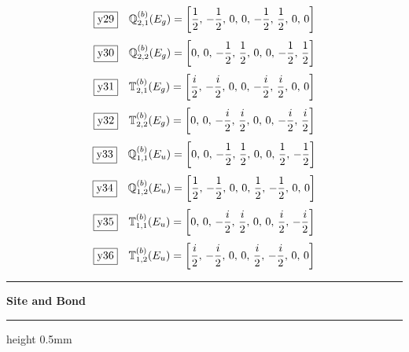 \documentclass[fleqn,10pt,landscape]{jsarticle}
\begin{document}
\begin{dmath*}
\fbox{y29}\quad \mathbb{Q}_{2,1}^{(b)}(E_{g})=\left[ \frac{1}{2},\, - \frac{1}{2},\, 0,\, 0,\, - \frac{1}{2},\, \frac{1}{2},\, 0,\, 0 \right]
\end{dmath*}
\begin{dmath*}
\fbox{y30}\quad \mathbb{Q}_{2,2}^{(b)}(E_{g})=\left[ 0,\, 0,\, - \frac{1}{2},\, \frac{1}{2},\, 0,\, 0,\, - \frac{1}{2},\, \frac{1}{2} \right]
\end{dmath*}
\begin{dmath*}
\fbox{y31}\quad \mathbb{T}_{2,1}^{(b)}(E_{g})=\left[ \frac{i}{2},\, - \frac{i}{2},\, 0,\, 0,\, - \frac{i}{2},\, \frac{i}{2},\, 0,\, 0 \right]
\end{dmath*}
\begin{dmath*}
\fbox{y32}\quad \mathbb{T}_{2,2}^{(b)}(E_{g})=\left[ 0,\, 0,\, - \frac{i}{2},\, \frac{i}{2},\, 0,\, 0,\, - \frac{i}{2},\, \frac{i}{2} \right]
\end{dmath*}
\begin{dmath*}
\fbox{y33}\quad \mathbb{Q}_{1,1}^{(b)}(E_{u})=\left[ 0,\, 0,\, - \frac{1}{2},\, \frac{1}{2},\, 0,\, 0,\, \frac{1}{2},\, - \frac{1}{2} \right]
\end{dmath*}
\begin{dmath*}
\fbox{y34}\quad \mathbb{Q}_{1,2}^{(b)}(E_{u})=\left[ \frac{1}{2},\, - \frac{1}{2},\, 0,\, 0,\, \frac{1}{2},\, - \frac{1}{2},\, 0,\, 0 \right]
\end{dmath*}
\begin{dmath*}
\fbox{y35}\quad \mathbb{T}_{1,1}^{(b)}(E_{u})=\left[ 0,\, 0,\, - \frac{i}{2},\, \frac{i}{2},\, 0,\, 0,\, \frac{i}{2},\, - \frac{i}{2} \right]
\end{dmath*}
\begin{dmath*}
\fbox{y36}\quad \mathbb{T}_{1,2}^{(b)}(E_{u})=\left[ \frac{i}{2},\, - \frac{i}{2},\, 0,\, 0,\, \frac{i}{2},\, - \frac{i}{2},\, 0,\, 0 \right]
\end{dmath*}
\vspace{5mm}
\noindent \rule[0.5mm]{5mm}{0.5mm}\hspace{3mm}\textbf{Site and Bond}\hspace{3mm}\leaders\hrule height 0.5mm\hfill\kern0pt
\vspace{3mm}
\end{document}
